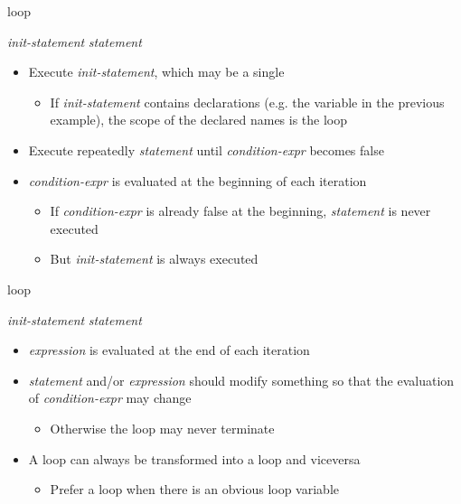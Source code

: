 \begin{frame}[fragile]{ loop}

   \textit{init-statement}  \code{;}
   \code{)} \textit{statement}

  \pause

  \begin{itemize}[<+->]
  \item Execute \textit{init-statement}, which may be a single \code{;}
    \begin{itemize}
    \item If \textit{init-statement} contains declarations (e.g. the 
      variable in the previous example), the scope of the declared names is
      the loop
    \end{itemize}
  \item Execute repeatedly \textit{statement} until \textit{condition-expr} becomes false
  \item \textit{condition-expr} is evaluated at the beginning of each iteration
    \begin{itemize}
    \item If \textit{condition-expr} is already false at the beginning,
      \textit{statement} is never executed
    \item But \textit{init-statement} is always executed
    \end{itemize}
  \end{itemize}

\end{frame}

\begin{frame}[fragile]{ loop \insertcontinuationtext}

   \textit{init-statement}  \code{;}
   \code{)} \textit{statement}

  \pause

  \begin{itemize}[<+->]
  \item \textit{expression} is evaluated at the end of each iteration
  \item \textit{statement} and/or \textit{expression} should modify something so
    that the evaluation of \textit{condition-expr} may change
    \begin{itemize}[<.->]
    \item Otherwise the loop may never terminate
    \end{itemize}
  \item A  loop can always be transformed into a  loop and
    viceversa
    \begin{itemize}
    \item Prefer a  loop when there is an obvious loop variable
    \end{itemize}
  \end{itemize}
\end{frame}

